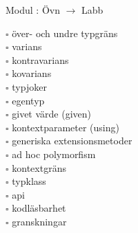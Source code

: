 
    Modul : Övn  $\rightarrow$ Labb 
    \begin{multicols}{3}\SlideFontTiny
    $\square$ över- och undre typgräns \\
$\square$ varians \\
$\square$ kontravarians \\
$\square$ kovarians \\
$\square$ typjoker \\
$\square$ egentyp \\
$\square$ givet värde (given) \\
$\square$ kontextparameter (using) \\
$\square$ generiska extensionsmetoder \\
$\square$ ad hoc polymorfism \\
$\square$ kontextgräns \\
$\square$ typklass \\
$\square$ api \\
$\square$ kodläsbarhet \\
$\square$ granskningar \\
    \end{multicols}
    